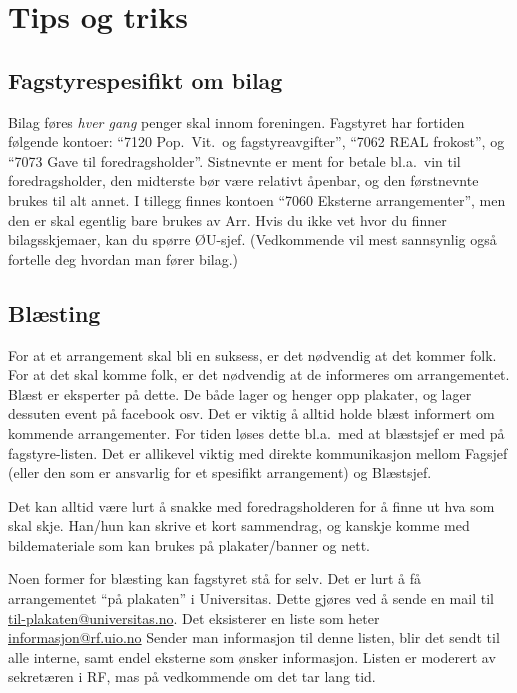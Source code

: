 \section{Tips og triks}
\subsection{Fagstyrespesifikt om bilag}
\label{fagstyret:sec:bilag}
Bilag føres \emph{hver gang} penger skal innom foreningen. 
Fagstyret har fortiden følgende kontoer:
``7120 Pop.~Vit.~og fagstyreavgifter'',
``7062 REAL frokost'', og
``7073 Gave til foredragsholder''.
Sistnevnte er ment for  betale bl.a.~vin til foredragsholder,
den midterste bør være relativt åpenbar,
og den førstnevnte brukes til alt annet.
I tillegg finnes kontoen
``7060 Eksterne arrangementer'', men den er skal egentlig bare brukes av Arr.
Hvis du ikke vet hvor du finner bilagsskjemaer, kan du spørre ØU-sjef.
(Vedkommende vil mest sannsynlig også fortelle deg hvordan man fører bilag.)

\subsection{Blæsting}
For at et arrangement skal bli en suksess, er det nødvendig at det kommer
folk. For at det skal komme folk, er det nødvendig at de informeres om
arrangementet.
Blæst er eksperter på dette. De både lager og henger opp plakater, og lager
dessuten event på facebook osv.
Det er viktig å alltid holde blæst informert om kommende arrangementer.
For tiden løses dette bl.a.~med at blæstsjef er med på fagstyre-listen.
Det er allikevel viktig med direkte kommunikasjon mellom Fagsjef (eller
den som er ansvarlig for et spesifikt arrangement) og Blæstsjef.

Det kan alltid være lurt å snakke med foredragsholderen for å finne ut
hva som skal skje. Han/hun kan skrive et kort sammendrag, og kanskje komme
med bildemateriale som kan brukes på plakater/banner og nett.

Noen former for blæsting kan fagstyret stå for selv. Det er lurt å få 
arrangementet ``på plakaten'' i Universitas. Dette gjøres ved å sende
en mail til \url{til-plakaten@universitas.no}.
Det eksisterer en liste som heter \url{informasjon@rf.uio.no}
Sender man informasjon til denne listen, blir
det sendt til alle interne, samt endel eksterne som ønsker informasjon.
Listen er moderert av sekretæren i RF, mas på vedkommende om det tar lang tid.

